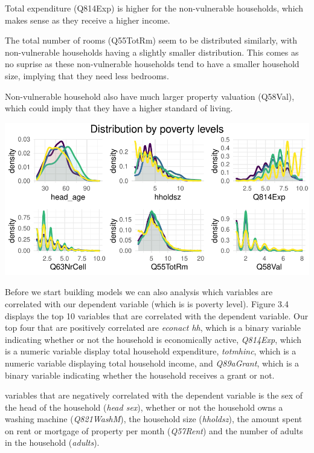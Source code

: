 \documentclass[11pt,preprint, authoryear]{elsarticle}
\let\origfigure\figure
\let\endorigfigure\endfigure
\renewenvironment{figure}[1][2] {
    \expandafter\origfigure\expandafter[H]
} {
    \endorigfigure
}
\numberwithin{equation}{section}
\numberwithin{figure}{section}
\numberwithin{table}{section}
\begin{document}
Total expenditure (Q814Exp) is higher for the non-vulnerable households,
which makes sense as they receive a higher income.

The total number of rooms (Q55TotRm) seem to be distributed similarly,
with non-vulnerable households having a slightly smaller distribution.
This comes as no suprise as these non-vulnerable households tend to have
a smaller household size, implying that they need less bedrooms.

Non-vulnerable household also have much larger property valuation
(Q58Val), which could imply that they have a higher standard of living.

\begin{figure}[H]

{\centering \includegraphics{Predicting-Poverty_files/figure-latex/Figure3-1} 

}

\caption{Distribution of certain variables by poverty level \label{Figure3}}\label{fig:Figure3}
\end{figure}

Before we start building models we can also analysis which variables are
correlated with our dependent variable (which is is poverty level).
Figure 3.4 displays the top 10 variables that are correlated with the
dependent variable. Our top four that are positively correlated are
\textit{econact hh}, which is a binary variable indicating whether or
not the household is economically active, \emph{Q814Exp}, which is a
numeric variable display total household expenditure, \emph{totmhinc},
which is a numeric variable displaying total household income, and
\emph{Q89aGrant}, which is a binary variable indicating whether the
household receives a grant or not.

variables that are negatively correlated with the dependent variable is
the sex of the head of the household (\emph{head sex}), whether or not
the household owns a washing machine (\emph{Q821WashM}), the household
size (\emph{hholdsz}), the amount spent on rent or mortgage of property
per month (\emph{Q57Rent}) and the number of adults in the household
(\emph{adults}).
\end{document}
